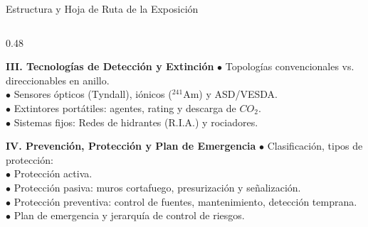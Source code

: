 \begin{frame}{Estructura y Hoja de Ruta de la Exposición}
\begin{columns}[T]
    \begin{column}{0.48\textwidth}
      \begin{block}{\textbf{III. Tecnologías de Detección y Extinción}}
        \scriptsize
        $\bullet$ Topologías convencionales vs. direccionables en anillo.\\
        $\bullet$ Sensores ópticos (Tyndall), iónicos ($^{241}\mathrm{Am}$) y ASD/VESDA.\\
        $\bullet$ Extintores portátiles: agentes, rating y descarga de $CO_2$.\\
        $\bullet$ Sistemas fijos: Redes de hidrantes (R.I.A.) y rociadores.
      \end{block}
      \vspace{0.2cm}
      \begin{block}{\textbf{IV. Prevención, Protección y Plan de Emergencia}}
        \scriptsize
        $\bullet$ Clasificación, tipos de protección:\\
        $\bullet$ Protección activa.\\
        $\bullet$ Protección pasiva: muros cortafuego, presurización y señalización.\\
        $\bullet$ Protección preventiva: control de fuentes,  mantenimiento,
          detección temprana.\\
        $\bullet$ Plan de emergencia y jerarquía de control de riesgos.
      \end{block}
    \end{column}
  \end{columns}
\end{frame}
